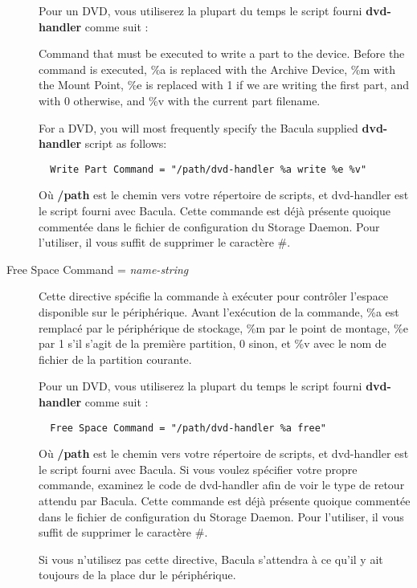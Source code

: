 \begin{description}
   Pour un DVD, vous utiliserez la plupart du temps le script fourni {\bf dvd-handler} 
   comme suit :

Command that must be executed to write a part to the device. Before the 
   command is executed, \%a is replaced with the Archive Device, \%m with the 
   Mount Point, \%e is replaced with 1 if we are writing the first part,
   and with 0 otherwise, and \%v with the current part filename.

   For a DVD, you will most frequently specify the Bacula supplied  {\bf
   dvd-handler} script as follows:  

\footnotesize
\begin{verbatim}
  Write Part Command = "/path/dvd-handler %a write %e %v"
\end{verbatim}
\normalsize

  O\`u {\bf /path} est le chemin vers votre r\'epertoire de scripts, et 
  dvd-handler est le script fourni avec Bacula. Cette commande est d\'ej\`a pr\'esente 
  quoique comment\'ee dans le fichier de configuration du Storage Daemon. Pour l'utiliser, 
  il vous suffit de supprimer le caract\`ere \#.

\item [Free Space Command = {\it name-string}]
   Cette directive sp\'ecifie la commande \`a ex\'ecuter pour contr\^oler l'espace disponible 
   sur le p\'eriph\'erique. Avant l'ex\'ecution de la commande, \%a est remplac\'e par le p\'eriph\'erique de 
   stockage, \%m par le point de montage, \%e par 1 s'il s'agit de la premi\`ere
   partition, 0 sinon, et \%v avec le nom de fichier de la partition courante.

   Pour un DVD, vous utiliserez la plupart du temps le script fourni {\bf dvd-handler}
   comme suit :

\footnotesize
\begin{verbatim}
  Free Space Command = "/path/dvd-handler %a free"
\end{verbatim}
\normalsize

   O\`u {\bf /path} est le chemin vers votre r\'epertoire de scripts, et
   dvd-handler est le script fourni avec Bacula. Si vous voulez 
   sp\'ecifier votre propre commande, examinez le code de dvd-handler afin de 
   voir le type de retour attendu par Bacula. Cette commande est d\'ej\`a pr\'esente
   quoique comment\'ee dans le fichier de configuration du Storage Daemon. Pour l'utiliser,
   il vous suffit de supprimer le caract\`ere \#.

   Si vous n'utilisez pas cette directive, Bacula s'attendra \`a ce qu'il y ait 
   toujours de la place dur le p\'eriph\'erique.

\end{description}

